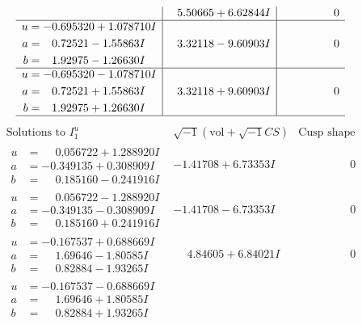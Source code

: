 \documentclass[1p]{elsarticle_modified}
\theoremstyle{definition}
\newcommand{\I}{\sqrt{-1}}
\begin{document}
$$\begin{array}{c|c|c}
 & \phantom{-}5.50665 + 6.62844 I & \phantom{-0.000000 } 0 \\ \hline\begin{aligned}
u &= -0.695320 + 1.078710 I \\
a &= \phantom{-}0.72521 - 1.55863 I \\
b &= \phantom{-}1.92975 - 1.26630 I\end{aligned}
 & \phantom{-}3.32118 - 9.60903 I & \phantom{-0.000000 } 0 \\ \hline\begin{aligned}
u &= -0.695320 - 1.078710 I \\
a &= \phantom{-}0.72521 + 1.55863 I \\
b &= \phantom{-}1.92975 + 1.26630 I\end{aligned}
 & \phantom{-}3.32118 + 9.60903 I & \phantom{-0.000000 } 0\\
 \hline 
 \end{array}$$\newpage$$\begin{array}{c|c|c}  
\text{Solutions to }I^u_{1}& \I (\text{vol} + \sqrt{-1}CS) & \text{Cusp shape}\\
 \hline 
\begin{aligned}
u &= \phantom{-}0.056722 + 1.288920 I \\
a &= -0.349135 + 0.308909 I \\
b &= \phantom{-}0.185160 - 0.241916 I\end{aligned}
 & -1.41708 + 6.73353 I & \phantom{-0.000000 } 0 \\ \hline\begin{aligned}
u &= \phantom{-}0.056722 - 1.288920 I \\
a &= -0.349135 - 0.308909 I \\
b &= \phantom{-}0.185160 + 0.241916 I\end{aligned}
 & -1.41708 - 6.73353 I & \phantom{-0.000000 } 0 \\ \hline\begin{aligned}
u &= -0.167537 + 0.688669 I \\
a &= \phantom{-}1.69646 - 1.80585 I \\
b &= \phantom{-}0.82884 - 1.93265 I\end{aligned}
 & \phantom{-}4.84605 + 6.84021 I & \phantom{-0.000000 } 0 \\ \hline\begin{aligned}
u &= -0.167537 - 0.688669 I \\
a &= \phantom{-}1.69646 + 1.80585 I \\
b &= \phantom{-}0.82884 + 1.93265 I\end{aligned}

\end{array}$$
\end{document}
